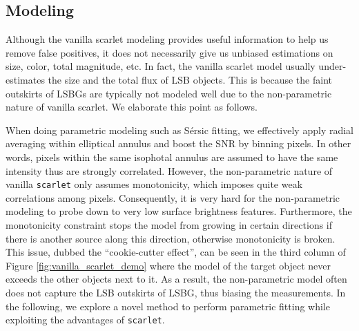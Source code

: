\documentclass[twocolumn,astrosymb,twocolappendix]{aastex631}
\newcommand{\code}[1]{\texttt{#1}}
\newcommand{\sersic}{S\'ersic}
\begin{document}
\begin{CJK*}{UTF8}{gbsn}

\subsection{Modeling}\label{sec:modeling}
Although the vanilla scarlet modeling provides useful information to help us remove false positives, it does not necessarily give us unbiased estimations on size, color, total magnitude, etc. In fact, the vanilla scarlet model usually under-estimates the size and the total flux of LSB objects. This is because the faint outskirts of LSBGs are typically not modeled well due to the non-parametric nature of vanilla scarlet. We elaborate this point as follows.

When doing parametric modeling such as \sersic{} fitting, we effectively apply radial averaging within elliptical annulus and boost the SNR by binning pixels. In other words, pixels within the same isophotal annulus are assumed to have the same intensity thus are strongly correlated. However, the non-parametric nature of vanilla \code{scarlet} only assumes monotonicity, which imposes quite weak correlations among pixels. Consequently, it is very hard for the non-parametric modeling to probe down to very low surface brightness features. Furthermore, the monotonicity constraint stops the model from growing in certain directions if there is another source along this direction, otherwise monotonicity is broken. This issue, dubbed the ``cookie-cutter effect'', can be seen in the third column of Figure \ref{fig:vanilla_scarlet_demo} where the model of the target object never exceeds the other objects next to it. As a result, the non-parametric model often does not capture the LSB outskirts of LSBG, thus biasing the measurements. In the following, we explore a novel method to perform parametric fitting while exploiting the advantages of \code{scarlet}.


\end{CJK*}
\end{document}
